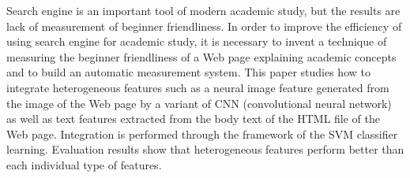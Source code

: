 Search engine is an important tool of modern academic study, but the results are lack of measurement of beginner friendliness. In order to improve the efficiency of using search engine for academic study, it is necessary to invent a technique of measuring the beginner friendliness of a Web page explaining academic concepts and to build an automatic measurement system.  This paper studies how to integrate heterogeneous features such as a neural image feature generated from the image of the Web page by a variant of CNN (convolutional neural network) as well as text features extracted from the body text of the HTML file of the Web page. Integration is performed through the framework of the SVM classifier learning.  Evaluation results show that heterogeneous features perform better than each individual type of features.
